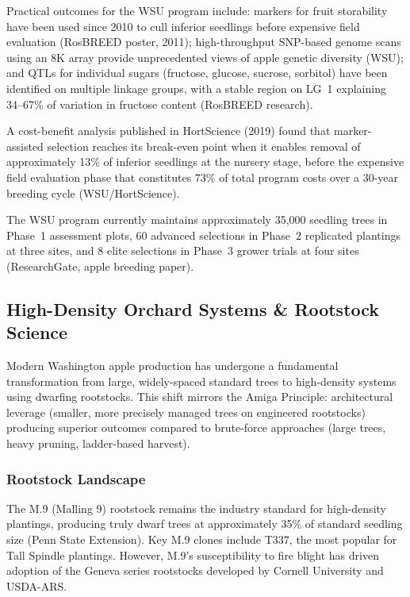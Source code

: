 \documentclass[11pt,letterpaper]{article}
\begin{document}
Practical outcomes for the WSU program include: markers for fruit storability have been used since 2010 to cull inferior seedlings before expensive field evaluation (RosBREED poster, 2011); high-throughput SNP-based genome scans using an 8K array provide unprecedented views of apple genetic diversity (WSU); and QTLs for individual sugars (fructose, glucose, sucrose, sorbitol) have been identified on multiple linkage groups, with a stable region on LG~1 explaining 34--67\% of variation in fructose content (RosBREED research).

A cost-benefit analysis published in HortScience (2019) found that marker-assisted selection reaches its break-even point when it enables removal of approximately 13\% of inferior seedlings at the nursery stage, before the expensive field evaluation phase that constitutes 73\% of total program costs over a 30-year breeding cycle (WSU/HortScience).

The WSU program currently maintains approximately 35,000 seedling trees in Phase~1 assessment plots, 60 advanced selections in Phase~2 replicated plantings at three sites, and 8 elite selections in Phase~3 grower trials at four sites (ResearchGate, apple breeding paper).

\subsection{High-Density Orchard Systems \& Rootstock Science}

Modern Washington apple production has undergone a fundamental transformation from large, widely-spaced standard trees to high-density systems using dwarfing rootstocks. This shift mirrors the Amiga Principle: architectural leverage (smaller, more precisely managed trees on engineered rootstocks) producing superior outcomes compared to brute-force approaches (large trees, heavy pruning, ladder-based harvest).

\subsubsection{Rootstock Landscape}

The M.9 (Malling 9) rootstock remains the industry standard for high-density plantings, producing truly dwarf trees at approximately 35\% of standard seedling size (Penn State Extension). Key M.9 clones include T337, the most popular for Tall Spindle plantings. However, M.9's susceptibility to fire blight has driven adoption of the Geneva series rootstocks developed by Cornell University and USDA-ARS.
\end{document}
